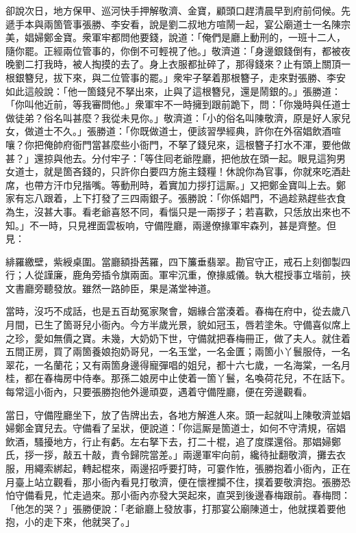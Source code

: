 卻說次日，地方保甲、巡河快手押解敬濟、金寶，顧頭口趕清晨早到府前伺候。先遞手本與兩箇管事張勝、李安看，說是劉二叔地方喧鬧一起，宴公廟道士一名陳宗美，娼婦鄭金寶。衆軍牢都問他要錢，說道：「俺們是廳上動刑的，一班十二人，隨你罷。正經兩位管事的，你倒不可輕視了他。」敬濟道：「身邊銀錢倒有，都被夜晚劉二打我時，被人掏摸的去了。身上衣服都扯碎了，那得錢來？止有頭上關頂一根銀簪兒，拔下來，與二位管事的罷。」{}衆牢子拏着那根簪子，走來對張勝、李安如此這般說：「他一箇錢兒不拏出來，止與了這根簪兒，還是鬧銀的。」張勝道：「你叫他近前，等我審問他。」衆軍牢不一時擁到跟前跪下，問：「你幾時與任道士做徒弟？俗名叫甚麼？我從未見你。」敬濟道：「小的俗名叫陳敬濟，原是好人家兒女，做道士不久。」張勝道：「你既做道士，便該習學經典，許你在外宿娼飲酒喧嚷？你把俺帥府衙門當甚麼些小衙門，不拏了錢兒來，這根簪子打水不渾，要他做甚？」還掠與他去。分付牢子：「等住囘老爺陞廳，把他放在頭一起。眼見這狗男女道士，就是箇吝錢的，只許你白要四方施主錢糧！休說你為官事，你就來吃酒赴席，也帶方汗巾兒揩嘴。等動刑時，着實加力拶打這厮。」又把鄭金寶叫上去。鄭家有忘八跟着，上下打發了三四兩銀子。張勝說：「你係娼門，不過趁熟趕些衣食為生，沒甚大事。看老爺喜怒不同，看惱只是一兩拶子；若喜歡，只恁放出來也不知。」不一時，只見裡面雲板响，守備陞廳，兩邊僚掾軍牢森列，甚是齊整。但見：

\begin{myquote}
緋羅繳壁，紫綬桌圍。當廳額掛茜羅，四下簾垂翡翠。勘官守正，戒石上刻御製四行；人從謹廉，鹿角旁插令旗兩面。軍牢沉重，僚掾威儀。執大棍授事立堦前，挾文書廳旁聽發放。雖然一路帥臣，果是滿堂神道。
\end{myquote}

當時，沒巧不成話，也是五百劫冤家聚會，姻緣合當湊着。春梅在府中，從去歲八月間，已生了箇哥兒小衙內。{}今方半歲光景，貌如冠玉，唇若塗朱。守備喜似席上之珍，愛如無價之寶。未幾，大奶奶下世，守備就把春梅冊正，做了夫人。{}就住着五間正房，買了兩箇養娘抱奶哥兒，一名玉堂，一名金匱；兩箇小丫鬟服侍，一名翠花，一名蘭花；又有兩箇身邊得寵彈唱的姐兒，都十六七歲，一名海棠，一名月桂，都在春梅房中侍奉。那孫二娘房中止使着一箇丫鬟，名喚荷花兒，不在話下。每常這小衙內，只要張勝抱他外邊頑耍，遇着守備陞廳，便在旁邊觀看。

當日，守備陞廳坐下，放了告牌出去，各地方解進人來。頭一起就叫上陳敬濟並娼婦鄭金寶兒去。守備看了呈狀，便說道：「你這厮是箇道士，如何不守清規，宿娼飲酒，騷擾地方，行止有虧。左右拏下去，打二十棍，追了度牒還俗。{}那娼婦鄭氏，拶一拶，敲五十敲，責令歸院當差。」兩邊軍牢向前，纔待扯翻敬濟，攤去衣服，用繩索綁起，轉起棍來，兩邊招呼要打時，可霎作恠，張勝抱着小衙內，正在月臺上站立觀看，那小衙內看見打敬濟，便在懷裡攔不住，撲着要敬濟抱。張勝恐怕守備看見，忙走過來。那小衙內亦發大哭起來，直哭到後邊春梅跟前。春梅問：「他怎的哭？」張勝便說：「老爺廳上發放事，打那宴公廟陳道士，他就撲着要他抱，小的走下來，他就哭了。」

